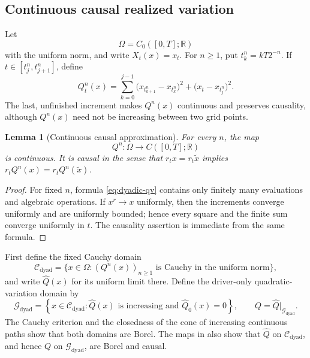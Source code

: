 \documentclass[11pt,reqno]{amsart}
\theoremstyle{plain}
\newtheorem{lemma}[lemma]{Lemma}
\theoremstyle{definition}
\newcommand{\R}{\mathbb R}
\newcommand{\cC}{\mathcal C}
\newcommand{\cG}{\mathcal G}
\begin{document}
\subsection{Continuous causal realized variation}

Let
\[
  \Omega=C_0([0,T];\R)
\]
with the uniform norm, and write \(X_t(x)=x_t\).  For
\(n\ge1\), put \(t_k^n=kT2^{-n}\).  If
\(t\in[t_j^n,t_{j+1}^n]\), define
\begin{equation}\label{eq:dyadic-qv}
  Q_t^n(x)
  =
  \sum_{k=0}^{j-1}
    \bigl(x_{t_{k+1}^n}-x_{t_k^n}\bigr)^2
  +\bigl(x_t-x_{t_j^n}\bigr)^2 .
\end{equation}
The last, unfinished increment makes \(Q^n(x)\) continuous and preserves
causality, although \(Q^n(x)\) need not be increasing between two grid
points.

\begin{lemma}[Continuous causal approximation]\label{lem:dyadic-continuous}
For every \(n\), the map
\[
  Q^n:\Omega\longrightarrow C([0,T];\R)
\]
is continuous.  It is causal in the sense that
\(r_tx=r_t\widetilde x\) implies
\(r_tQ^n(x)=r_tQ^n(\widetilde x)\).
\end{lemma}

\begin{proof}
For fixed \(n\), formula \eqref{eq:dyadic-qv} contains only finitely many
evaluations and algebraic operations.  If \(x^r\to x\) uniformly, then the
increments converge uniformly and are uniformly bounded; hence every square
and the finite sum converge uniformly in \(t\).  The causality assertion is
immediate from the same formula.
\end{proof}

First define the fixed Cauchy domain
\[
  \cC_{\mathrm{dyad}}
  =\{x\in\Omega:(Q^n(x))_{n\ge1}
       \text{ is Cauchy in the uniform norm}\},
\]
and write \(\widehat Q(x)\) for its uniform limit there.  Define the
driver-only quadratic-variation domain by
\begin{equation}\label{eq:Gdyad}
  \cG_{\mathrm{dyad}}
  =
  \left\{
    x\in\cC_{\mathrm{dyad}}:
    \widehat Q(x)\text{ is increasing and }\widehat Q_0(x)=0
  \right\},
  \qquad Q=\widehat Q\big|_{\cG_{\mathrm{dyad}}}.
\end{equation}
The Cauchy criterion and the closedness of the cone of increasing continuous
paths show that both domains are Borel.  The maps in
 also show that \(\widehat Q\) on
\(\cC_{\mathrm{dyad}}\), and hence \(Q\) on \(\cG_{\mathrm{dyad}}\), are
Borel and causal.
\end{document}

